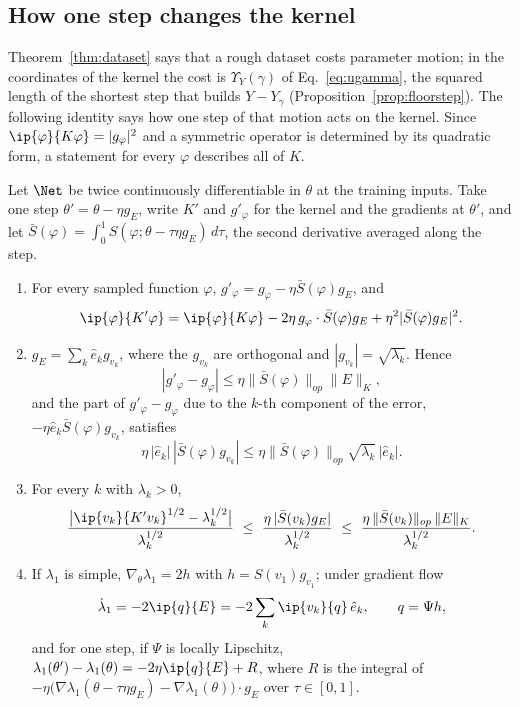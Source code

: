 \subsection{How one step changes the kernel}\label{eos:sec:kernel}

Theorem~\ref{thm:dataset} says that a rough dataset costs parameter motion; in the coordinates of the kernel the cost is $\Upsilon_Y(\gamma)$ of Eq.~\eqref{eq:ugamma}, the squared length of the shortest step that builds $Y - Y_\gamma$ (Proposition~\ref{prop:floorstep}).
The following identity says how one step of that motion acts on the kernel.
Since $\ip{\varphi}{K\varphi} = |g_\varphi|^2$ and a symmetric operator is determined by its quadratic form, a statement for every $\varphi$ describes all of $K$.

\begin{proposition}\label{eos:prop:kstep}
Let $\Net$ be twice continuously differentiable in $\theta$ at the training inputs. Take one step $\theta' = \theta - \eta g_E$, write $K'$ and $g'_\varphi$ for the kernel and the gradients at $\theta'$, and let $\bar S(\varphi) = \int_0^1S(\varphi;\theta - \tau\eta g_E)\,d\tau$, the second derivative averaged along the step.
\begin{enumerate}[label=(\alph*)]
\item For every sampled function $\varphi$, $g'_\varphi = g_\varphi - \eta\bar S(\varphi)g_E$, and
\begin{equation}\label{eos:eq:kstep}
\ip{\varphi}{K'\varphi} = \ip{\varphi}{K\varphi} - 2\eta\,g_\varphi\cdot\bar S(\varphi)g_E + \eta^2|\bar S(\varphi)g_E|^2 .
\end{equation}
\item $g_E = \sum_k\hat e_kg_{v_k}$, where the $g_{v_k}$ are orthogonal and $|g_{v_k}| = \sqrt{\lambda_k}$. Hence
\[
|g'_\varphi - g_\varphi|\le\eta\|\bar S(\varphi)\|_{op}\|E\|_K ,
\]
and the part of $g'_\varphi - g_\varphi$ due to the $k$-th component of the error, $-\eta\hat e_k\bar S(\varphi)g_{v_k}$, satisfies
\[
\eta\,|\hat e_k|\,|\bar S(\varphi)g_{v_k}|\le\eta\|\bar S(\varphi)\|_{op}\sqrt{\lambda_k}\,|\hat e_k| .
\]
\item For every $k$ with $\lambda_k > 0$,
\begin{equation}\label{eos:eq:relk}
\frac{\big|\ip{v_k}{K'v_k}^{1/2} - \lambda_k^{1/2}\big|}{\lambda_k^{1/2}}\ \le\ \frac{\eta\,|\bar S(v_k)g_E|}{\lambda_k^{1/2}}\ \le\ \frac{\eta\,\|\bar S(v_k)\|_{op}\,\|E\|_K}{\lambda_k^{1/2}} .
\end{equation}
\item If $\lambda_1$ is simple, $\nabla_\theta\lambda_1 = 2h$ with $h = S(v_1)g_{v_1}$; under gradient flow
\begin{equation}\label{eos:eq:rate}
\dot\lambda_1 = -2\ip{q}{E} = -2\sum_k\ip{v_k}{q}\,\hat e_k,\qquad q = \Psi h ,
\end{equation}
and for one step, if $\Psi$ is locally Lipschitz, $\lambda_1(\theta') - \lambda_1(\theta) = -2\eta\ip{q}{E} + R$, where $R$ is the integral of $-\eta\big(\nabla\lambda_1(\theta - \tau\eta g_E) - \nabla\lambda_1(\theta)\big)\cdot g_E$ over $\tau\in[0,1]$.
\end{enumerate}
\end{proposition}

